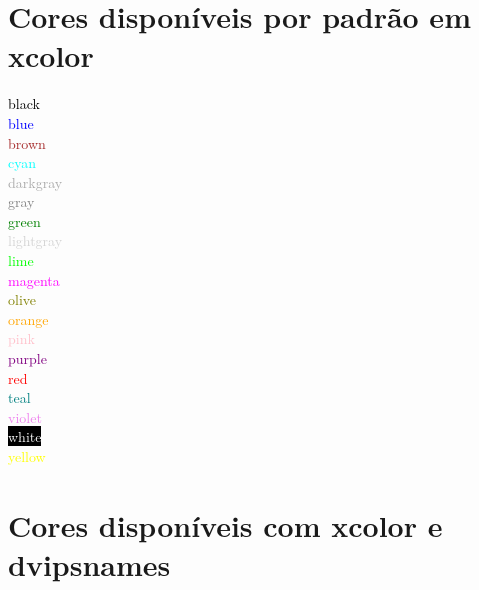 \documentclass[12pt]{article}
\begin{document}
\newpage
\pagecolor{white}
\section{Cores disponíveis por padrão em xcolor}

\textcolor{black}{black}\\
\textcolor{blue}{blue}\\
\textcolor{brown}{brown}\\
\textcolor{cyan}{cyan}\\
\textcolor{darkgray}{darkgray}\\
\textcolor{gray}{gray}\\
\textcolor{green}{green}\\
\textcolor{lightgray}{lightgray}\\
\textcolor{lime}{lime}\\
\textcolor{magenta}{magenta}\\
\textcolor{olive}{olive}\\
\textcolor{orange}{orange}\\
\textcolor{pink}{pink}\\
\textcolor{purple}{purple}\\
\textcolor{red}{red}\\
\textcolor{teal}{teal}\\
\textcolor{violet}{violet}\\
\colorbox{black}{\textcolor{white}{white}}\\
\textcolor{yellow}{yellow}

\section{Cores disponíveis com xcolor e dvipsnames}
\end{document}
